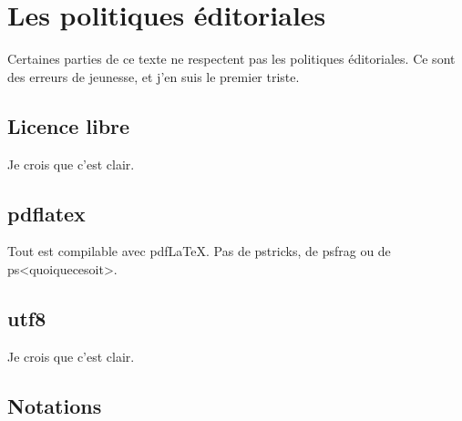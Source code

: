 \section{Les politiques éditoriales}

Certaines parties de ce texte ne respectent pas les politiques éditoriales. Ce sont des erreurs de jeunesse, et j'en suis le premier triste.

\subsection{Licence libre}

Je crois que c'est clair.

\subsection{pdflatex}

Tout est compilable avec pdf\LaTeX. Pas de pstricks, de psfrag ou de ps<quoiquecesoit>.

\subsection{utf8}

Je crois que c'est clair.

\subsection{Notations}

